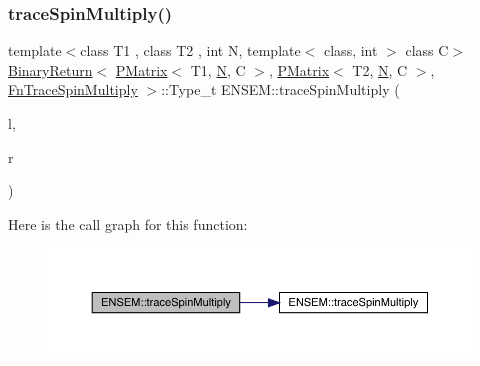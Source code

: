 \subsubsection{\texorpdfstring{traceSpinMultiply()}{traceSpinMultiply()}\hspace{0.1cm}{\footnotesize\ttfamily [1/3]}}
{\footnotesize\ttfamily template$<$class T1 , class T2 , int N, template$<$ class, int $>$ class C$>$ \\
\mbox{\hyperlink{structENSEM_1_1BinaryReturn}{Binary\+Return}}$<$ \mbox{\hyperlink{classENSEM_1_1PMatrix}{P\+Matrix}}$<$ T1, \mbox{\hyperlink{adat__devel_2lib_2hadron_2operator__name__util_8cc_a7722c8ecbb62d99aee7ce68b1752f337}{N}}, C $>$, \mbox{\hyperlink{classENSEM_1_1PMatrix}{P\+Matrix}}$<$ T2, \mbox{\hyperlink{adat__devel_2lib_2hadron_2operator__name__util_8cc_a7722c8ecbb62d99aee7ce68b1752f337}{N}}, C $>$, \mbox{\hyperlink{structENSEM_1_1FnTraceSpinMultiply}{Fn\+Trace\+Spin\+Multiply}} $>$\+::Type\+\_\+t E\+N\+S\+E\+M\+::trace\+Spin\+Multiply (\begin{DoxyParamCaption}\item[{const \mbox{\hyperlink{classENSEM_1_1PMatrix}{P\+Matrix}}$<$ T1, \mbox{\hyperlink{adat__devel_2lib_2hadron_2operator__name__util_8cc_a7722c8ecbb62d99aee7ce68b1752f337}{N}}, C $>$ \&}]{l,  }\item[{const \mbox{\hyperlink{classENSEM_1_1PMatrix}{P\+Matrix}}$<$ T2, \mbox{\hyperlink{adat__devel_2lib_2hadron_2operator__name__util_8cc_a7722c8ecbb62d99aee7ce68b1752f337}{N}}, C $>$ \&}]{r }\end{DoxyParamCaption})\hspace{0.3cm}{\ttfamily [inline]}}

Here is the call graph for this function\+:\nopagebreak
\begin{figure}[H]
\begin{center}
\leavevmode
\includegraphics[width=350pt]{df/d0a/group__primmatrix_gabc920df179ac4bd2438224848ec237af_cgraph}
\end{center}
\end{figure}
\mbox{\label{group__primmatrix_gab5fbf23688b38c3209c80d2a9a22b3d0}} 
